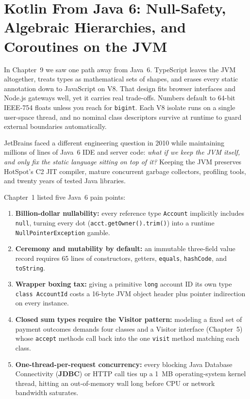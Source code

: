 \chapter{Kotlin From Java 6: Null-Safety, Algebraic Hierarchies, and Coroutines on the JVM}
\label{ch:kotlin-null-sealed-coroutines}

In Chapter~9 we saw one path away from Java~6. TypeScript leaves the JVM altogether, treats types as mathematical sets of shapes, and erases every static annotation down to JavaScript on V8. That design fits browser interfaces and Node.js gateways well, yet it carries real trade-offs. Numbers default to 64-bit IEEE-754 floats unless you reach for \texttt{bigint}. Each V8 isolate runs on a single user-space thread, and no nominal class descriptors survive at runtime to guard external boundaries automatically.

JetBrains faced a different engineering question in 2010 while maintaining millions of lines of Java~6 IDE and server code: \emph{what if we keep the JVM itself, and only fix the static language sitting on top of it?} Keeping the JVM preserves HotSpot's C2 JIT compiler, mature concurrent garbage collectors, profiling tools, and twenty years of tested Java libraries.

Chapter~1 listed five Java~6 pain points:
\begin{enumerate}
  \item \textbf{Billion-dollar nullability:} every reference type \texttt{Account} implicitly includes \texttt{null}, turning every dot (\texttt{acct.getOwner().trim()}) into a runtime \texttt{NullPointerException} gamble.
  \item \textbf{Ceremony and mutability by default:} an immutable three-field value record requires 65 lines of constructors, getters, \texttt{equals}, \texttt{hashCode}, and \texttt{toString}.
  \item \textbf{Wrapper boxing tax:} giving a primitive \texttt{long} account ID its own type \texttt{class AccountId} costs a 16-byte JVM object header plus pointer indirection on every instance.
  \item \textbf{Closed sum types require the Visitor pattern:} modeling a fixed set of payment outcomes demands four classes and a Visitor interface (Chapter~5) whose \texttt{accept} methods call back into the one \texttt{visit} method matching each class.
  \item \textbf{One-thread-per-request concurrency:} every blocking Java Database Connectivity (\textbf{JDBC}) or HTTP call ties up a 1~MB operating-system kernel thread, hitting an out-of-memory wall long before CPU or network bandwidth saturates.
\end{enumerate}

